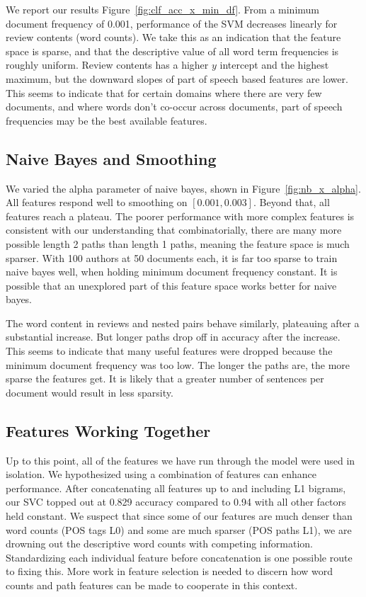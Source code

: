 \documentclass[11pt,a4paper]{article}
\begin{document}
We report our results Figure~\ref{fig:clf_acc_x_min_df}. From a minimum document frequency of 0.001, performance of the SVM decreases linearly for review contents (word counts). We take this as an indication that the feature space is sparse, and that the descriptive value of all word term frequencies is roughly uniform. Review contents has a higher $y$ intercept and the highest maximum, but the downward slopes of part of speech based features are lower. This seems to indicate that for certain domains where there are very few documents, and where words don't co-occur across documents, part of speech frequencies may be the best available features.

\subsection{Naive Bayes and Smoothing}


We varied the alpha parameter of naive bayes, shown in Figure~\ref{fig:nb_x_alpha}. All features respond well to smoothing on $[0.001, 0.003]$. Beyond that, all features reach a plateau. The poorer performance with more complex features is consistent with our understanding that combinatorially, there are many more possible length 2 paths than length 1 paths, meaning the feature space is much sparser. With 100 authors at 50 documents each, it is far too sparse to train naive bayes well, when holding minimum document frequency constant. It is possible that an unexplored part of this feature space works better for naive bayes.

The word content in reviews and nested pairs behave similarly, plateauing after a substantial increase. But longer paths drop off in accuracy after the increase. This seems to indicate that many useful features were dropped because the minimum document frequency was too low. The longer the paths are, the more sparse the features get. It is likely that a greater number of sentences per document would result in less sparsity.


\subsection{Features Working Together}

Up to this point, all of the features we have run through the model were used in isolation. We hypothesized using a combination of features can enhance performance. After concatenating all features up to and including L1 bigrams, our SVC topped out at 0.829 accuracy compared to 0.94 with all other factors held constant. We suspect that since some of our features are much denser than word counts (POS tags L0) and some are much sparser (POS paths L1), we are drowning out the descriptive word counts with competing information. Standardizing each individual feature before concatenation is one possible route to fixing this. More work in feature selection is needed to discern how word counts and path features can be made to cooperate in this context.
\end{document}
